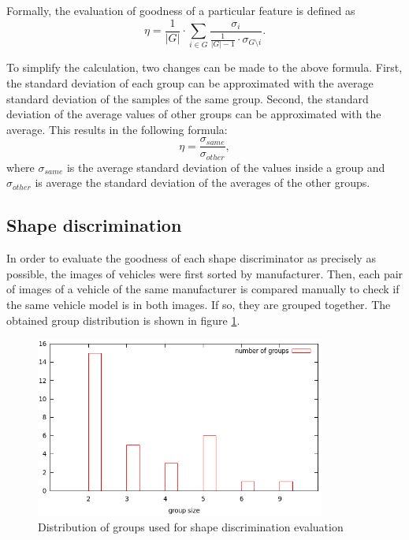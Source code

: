 \documentclass[times, utf8, zavrsni]{fer}
\begin{document}
Formally, the evaluation of goodness of a particular feature is defined as \[
\eta = \frac{1}{|G|} \cdot \sum_{i \in G}{\frac{\sigma_{i}} {\frac{1}{|G| - 1}
\cdot {\sigma_{G \setminus i}} }}. \]

To simplify the calculation, two changes can be made to the above formula.
First, the standard deviation of each group can be approximated with the average
standard deviation of the samples of the same group. Second, the standard
deviation of the average values of other groups can be approximated with the
average. This results in the following formula: \[\eta =
\frac{\sigma_{same}}{\sigma_{other}}, \] where $\sigma_{same}$ is the average
standard deviation of the values inside a group and $\sigma_{other}$ is average
the standard deviation of the averages of the other groups.

\subsection{Shape discrimination}

In order to evaluate the goodness of each shape discriminator as precisely as
possible, the images of vehicles were first sorted by manufacturer. Then, each
pair of images of a vehicle of the same manufacturer is compared manually to
check if the same vehicle model is in both images. If so, they are grouped
together. The obtained group distribution is shown in figure
\ref{fig:shape-group-distribution}.

\begin{figure}[htb]
\centering
\includegraphics[width=0.85\textwidth]{images/shape-group-distribution}
\caption{Distribution of groups used for shape discrimination evaluation}
\label{fig:shape-group-distribution}
\end{figure}

\end{document}
